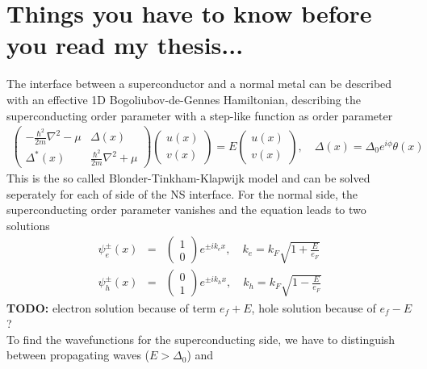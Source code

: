 \chapter{Things you have to know before you read my thesis...}
\label{ch:basics}

The interface between a superconductor and a normal metal can be described with an effective 1D Bogoliubov-de-Gennes Hamiltonian, describing the superconducting order parameter with a step-like function as order parameter
\begin{eqnarray}
\begin{pmatrix}
-\frac{\hbar^2}{2m} \nabla^2 - \mu & \Delta(x) \\
\Delta^*(x) & \frac{\hbar^2}{2m} \nabla^2 + \mu
\end{pmatrix}
\begin{pmatrix}
u(x) \\
v(x)
\end{pmatrix} = E 
\begin{pmatrix}
u(x)\\
v(x)
\end{pmatrix}, \quad \Delta(x) = \Delta_0 e^{i \phi} \theta(x)
\end{eqnarray}
This is the so called Blonder-Tinkham-Klapwijk model and can be solved seperately for each of side of the NS interface. For the normal side, the superconducting order parameter vanishes and the equation leads to two solutions
\begin{eqnarray}
\psi_e^{\pm}(x) &=& \begin{pmatrix} 1 \\ 0 \end{pmatrix} e^{\pm i k_e x}, \quad k_e = k_F \sqrt{1 + \frac{E}{e_F}}\\ 
\psi_h^{\pm}(x) &=& \begin{pmatrix} 0 \\ 1 \end{pmatrix} e^{\pm i k_h x}, \quad k_h =  k_F \sqrt{1 - \frac{E}{e_F}}
\end{eqnarray}
\textbf{TODO:} electron solution because of term $e_f + E$, hole solution because of $e_f - E$ ? \\
To find the wavefunctions for the superconducting side, we have to distinguish between propagating waves ($E > \Delta_0$) and 